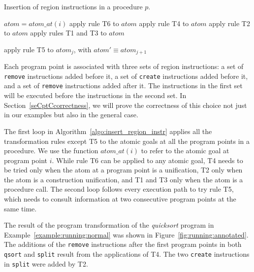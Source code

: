 \documentclass{tlp}
\newcommand{\ep}{\ensuremath{\langle {atom}_1, \ldots, {atom}_n \rangle}}
\newcommand{\atomat}[1]{\ensuremath{{atom\_at}(#1)}}
\newcommand{\code}[1]{{\tt#1}}
\begin{document}
\begin{algorithm}
    \small
    \caption{Insertion of region instructions in a procedure $p$.}
    \label{algo:insert_region_instr}
\begin{algorithmic}

    \STATE ${atom} = \atomat{i}$
    \STATE apply rule T6 to ${atom}$
            \STATE apply rule T4 to ${atom}$
                \STATE apply rule T2 to ${atom}$
            \ENDIF
        \ELSE
            \STATE apply rules T1 and T3 to ${atom}$
        \ENDIF
    \ENDFOR

    \FORALL{$\mathit{ep} \equiv \ep$ in $p$}
            \STATE apply rule T5 to ${atom}_j$, with ${atom}' \equiv {atom}_{j+1}$
        \ENDFOR
    \ENDFOR

\end{algorithmic}
\normalsize
\end{algorithm}

Each program point is associated with three sets of region instructions:
a set of \code{remove} instructions added before it,
a set of \code{create} instructions added before it, and
a set of \code{remove} instructions added after it.
The instructions in the first set will be executed
before the instructions in the second set.
In Section~\ref{seCptCcorrectness},
we will prove the correctness of this choice
not just in our examples but also in the general case.

The first loop in Algorithm~\ref{algo:insert_region_instr}
applies all the transformation rules except T5
to the atomic goals at all the program points in a procedure.
We use the function \atomat{i} to refer to
the atomic goal at program point $i$.
While rule T6 can be applied to any atomic goal,
T4 needs to be tried only when the atom at a program point is a unification,
T2 only when the atom is a construction unification, and
T1 and T3 only when the atom is a procedure call.
The second loop follows every execution path to try rule T5,
which needs to consult information at two consecutive program points
at the same time.

The result of the program transformation
of the \emph{quicksort} program in Example~\ref{example:running:normal}
was shown in Figure~\ref{fig:running:annotated}.
The additions of the \code{remove} instructions
after the first program points in both \code{qsort} and \code{split}
result from the applications of T4.
The two \code{create} instructions in \code{split} were added by T2.
\end{document}
